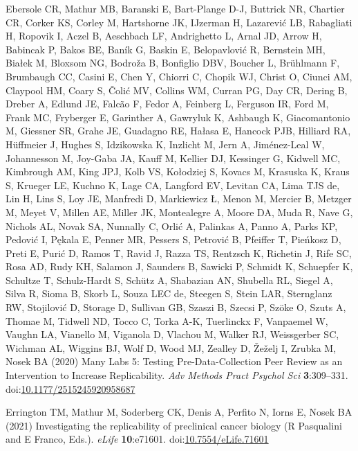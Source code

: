 \documentclass[
  english,
  a4paper,
]{article}
\newlength{\cslhangindent}
\newlength{\cslentryspacingunit} %
\newenvironment{CSLReferences}[2] %
 {%
  \setlength{\parindent}{0pt}
  \ifodd #1
  \let\oldpar\par
  \def\par{\hangindent=\cslhangindent\oldpar}
  \fi
  \setlength{\parskip}{#2\cslentryspacingunit}
 }%
 {}
\begin{document}
\begin{CSLReferences}{1}{0}
\leavevmode{}%
Ebersole CR, Mathur MB, Baranski E, Bart-Plange D-J, Buttrick NR, Chartier CR, Corker KS, Corley M, Hartshorne JK, IJzerman H, Lazarević LB, Rabagliati H, Ropovik I, Aczel B, Aeschbach LF, Andrighetto L, Arnal JD, Arrow H, Babincak P, Bakos BE, Baník G, Baskin E, Belopavlović R, Bernstein MH, Białek M, Bloxsom NG, Bodroža B, Bonfiglio DBV, Boucher L, Brühlmann F, Brumbaugh CC, Casini E, Chen Y, Chiorri C, Chopik WJ, Christ O, Ciunci AM, Claypool HM, Coary S, Čolić MV, Collins WM, Curran PG, Day CR, Dering B, Dreber A, Edlund JE, Falcão F, Fedor A, Feinberg L, Ferguson IR, Ford M, Frank MC, Fryberger E, Garinther A, Gawryluk K, Ashbaugh K, Giacomantonio M, Giessner SR, Grahe JE, Guadagno RE, Hałasa E, Hancock PJB, Hilliard RA, Hüffmeier J, Hughes S, Idzikowska K, Inzlicht M, Jern A, Jiménez-Leal W, Johannesson M, Joy-Gaba JA, Kauff M, Kellier DJ, Kessinger G, Kidwell MC, Kimbrough AM, King JPJ, Kolb VS, Kołodziej S, Kovacs M, Krasuska K, Kraus S, Krueger LE, Kuchno K, Lage CA, Langford EV, Levitan CA, Lima TJS de, Lin H, Lins S, Loy JE, Manfredi D, Markiewicz Ł, Menon M, Mercier B, Metzger M, Meyet V, Millen AE, Miller JK, Montealegre A, Moore DA, Muda R, Nave G, Nichols AL, Novak SA, Nunnally C, Orlić A, Palinkas A, Panno A, Parks KP, Pedović I, Pękala E, Penner MR, Pessers S, Petrović B, Pfeiffer T, Pieńkosz D, Preti E, Purić D, Ramos T, Ravid J, Razza TS, Rentzsch K, Richetin J, Rife SC, Rosa AD, Rudy KH, Salamon J, Saunders B, Sawicki P, Schmidt K, Schuepfer K, Schultze T, Schulz-Hardt S, Schütz A, Shabazian AN, Shubella RL, Siegel A, Silva R, Sioma B, Skorb L, Souza LEC de, Steegen S, Stein LAR, Sternglanz RW, Stojilović D, Storage D, Sullivan GB, Szaszi B, Szecsi P, Szöke O, Szuts A, Thomae M, Tidwell ND, Tocco C, Torka A-K, Tuerlinckx F, Vanpaemel W, Vaughn LA, Vianello M, Viganola D, Vlachou M, Walker RJ, Weissgerber SC, Wichman AL, Wiggins BJ, Wolf D, Wood MJ, Zealley D, Žeželj I, Zrubka M, Nosek BA (2020) Many {Labs} 5: {Testing Pre-Data-Collection Peer Review} as an {Intervention} to {Increase Replicability}. \emph{Adv Methods Pract Psychol Sci} \textbf{3}:309--331. doi:\href{https://doi.org/10.1177/2515245920958687}{10.1177/2515245920958687}

\leavevmode{}%
Errington TM, Mathur M, Soderberg CK, Denis A, Perfito N, Iorns E, Nosek BA (2021) Investigating the replicability of preclinical cancer biology (R Pasqualini and E Franco, Eds.). \emph{eLife} \textbf{10}:e71601. doi:\href{https://doi.org/10.7554/eLife.71601}{10.7554/eLife.71601}


\end{CSLReferences}
\end{document}
